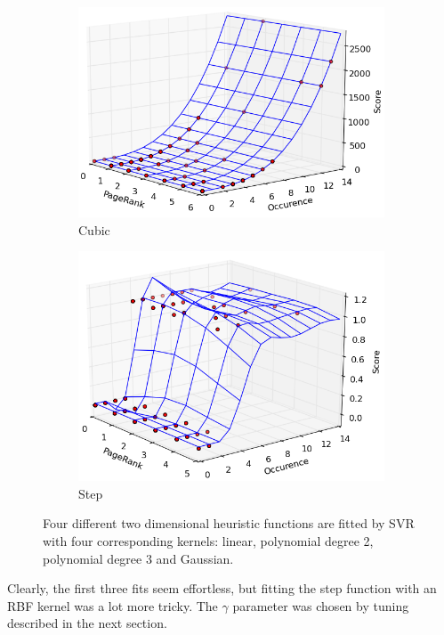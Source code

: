 \documentclass[12pt,notitlepage,twoside]{scrreprt}
\begin{document}
\begin{figure}[h!]
\begin{subfigure}[b]{.49\textwidth}
  \centering
  \includegraphics[width=1\linewidth]{figs/cub.png}
  \caption{Cubic}
  \label{cubic}
\end{subfigure}
\begin{subfigure}[b]{.49\textwidth}
  \centering
  \includegraphics[width=1\linewidth]{figs/step.png}
  \caption{Step}
  \label{step}
\end{subfigure}
\caption{Four different two dimensional heuristic functions are fitted by SVR with four
	corresponding kernels: linear, polynomial degree 2, polynomial degree 3 and Gaussian.\label{kernels}}
\end{figure}
Clearly, the first three fits seem effortless, but fitting the step function with an RBF
kernel was a lot more tricky. The $\gamma$ parameter was chosen by tuning described in the
next section.
\end{document}
